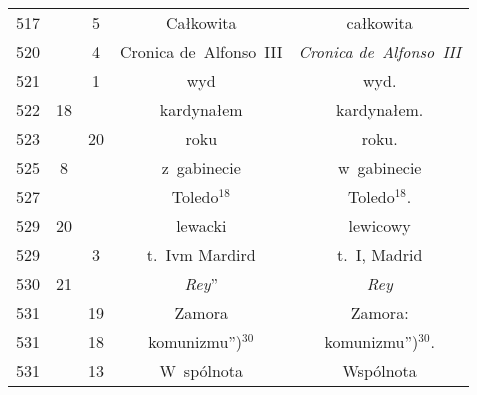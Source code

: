 \documentclass[a4paper,11pt]{article}
\begin{document}
\begin{center}
\begin{tabular}{|c|c|c|c|c|}
    517 & &  5 & Całkowita & całkowita \\
    520 & &  4 & Cronica de~Alfonso~III & \emph{Cronica de~Alfonso~III} \\
    521 & &  1 & wyd & wyd. \\
    522 & 18 & & kardynałem & kardynałem. \\
    523 & & 20 & roku & roku. \\
    525 &  8 & & z~gabinecie & w~gabinecie \\
    527 & & & Toledo$^{ 18 }$\tb{.} & Toledo$^{ 18 }$. \\
    529 & 20 & & lewacki & lewicowy \\
    529 & &  3 & t.~Ivm Mardird & t.~I, Madrid \\
    530 & 21 & &  %
                 \emph{Rey}'' & \emph{Rey} \\
    531 & & 19 & Zamora\tb{:} & Zamora: \\
    531 & & 18 &  %
                 komunizmu'')$^{ 30 }$\tb{.}
           & komunizmu'')$^{ 30 }$. \\
    531 & & 13 & W~spólnota & Wspólnota \\
    \hline
  \end{tabular}


\end{center}
\end{document}

